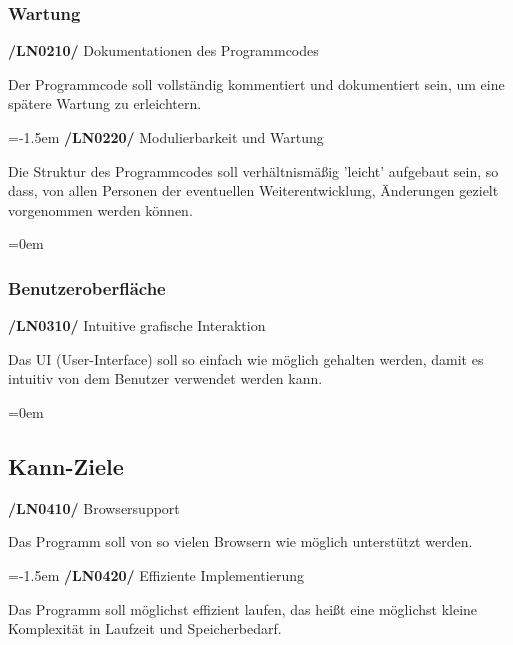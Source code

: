 \documentclass[11pt,a4paper]{report}
\begin{document}
\subsubsection{Wartung}

\textbf{/LN0210/} Dokumentationen des Programmcodes
\par
\begingroup
\leftskip=1cm
\noindent Der Programmcode soll vollständig kommentiert und dokumentiert sein, um eine spätere Wartung zu erleichtern.\\
\par
\endgroup

\newpage
\leftskip=-1.5em
\textbf{/LN0220/} Modulierbarkeit und Wartung
\par
\begingroup
\leftskip=1cm
\noindent Die Struktur des Programmcodes soll verhältnismäßig 'leicht' aufgebaut sein, so dass, von allen Personen der eventuellen Weiterentwicklung, Änderungen gezielt vorgenommen werden können.\\
\par
\endgroup

\leftskip=0em
\subsubsection{Benutzeroberfläche}

\textbf{/LN0310/} Intuitive grafische Interaktion
\par
\begingroup
\leftskip=1cm
\noindent Das UI (User-Interface) soll so einfach wie möglich gehalten werden, damit es intuitiv von dem Benutzer verwendet werden kann.\\
\par
\endgroup

\leftskip=0em
\subsection{Kann-Ziele}
\textbf{/LN0410/} Browsersupport
\par
\begingroup
\leftskip=1cm
\noindent Das Programm soll von so vielen Browsern wie möglich unterstützt werden.\\
\par
\endgroup

\leftskip=-1.5em
\textbf{/LN0420/} Effiziente Implementierung
\par
\begingroup
\leftskip=1cm
\noindent Das Programm soll möglichst effizient laufen, das heißt eine möglichst kleine Komplexität in Laufzeit und Speicherbedarf.\\
\par
\endgroup
\end{document}
